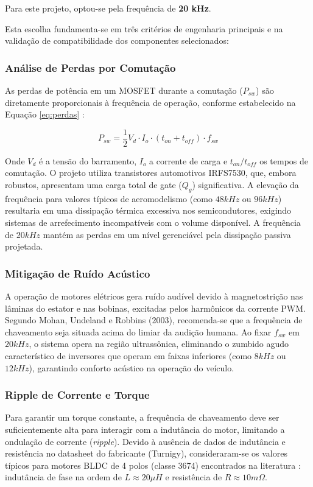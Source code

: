 Para este projeto, optou-se pela frequência de \textbf{20 kHz}.

Esta escolha fundamenta-se em três critérios de engenharia principais e na validação de compatibilidade dos componentes selecionados:

\subsubsection{Análise de Perdas por Comutação}
As perdas de potência em um MOSFET durante a comutação ($P_{sw}$) são diretamente proporcionais à frequência de operação, conforme estabelecido na Equação \ref{eq:perdas} \cite{rashid2014power}:

\begin{equation} \label{eq:perdas}
P_{sw} = \frac{1}{2} V_{d} \cdot I_{o} \cdot (t_{on} + t_{off}) \cdot f_{sw}
\end{equation}

Onde $V_d$ é a tensão do barramento, $I_o$ a corrente de carga e $t_{on}/t_{off}$ os tempos de comutação.
O projeto utiliza transistores automotivos IRFS7530, que, embora robustos, apresentam uma carga total de gate ($Q_g$) significativa. A elevação da frequência para valores típicos de aeromodelismo (como $48 kHz$ ou $96 kHz$) resultaria em uma dissipação térmica excessiva nos semicondutores, exigindo sistemas de arrefecimento incompatíveis com o volume disponível. A frequência de $20 kHz$ mantém as perdas em um nível gerenciável pela dissipação passiva projetada.

\subsubsection{Mitigação de Ruído Acústico}
A operação de motores elétricos gera ruído audível devido à magnetostrição nas lâminas do estator e nas bobinas, excitadas pelos harmônicos da corrente PWM. Segundo Mohan, Undeland e Robbins (2003), recomenda-se que a frequência de chaveamento seja situada acima do limiar da audição humana.
Ao fixar $f_{sw}$ em $20 kHz$, o sistema opera na região ultrassônica, eliminando o zumbido agudo característico de inversores que operam em faixas inferiores (como $8 kHz$ ou $12 kHz$), garantindo conforto acústico na operação do veículo.

\subsubsection{Ripple de Corrente e Torque}
Para garantir um torque constante, a frequência de chaveamento deve ser suficientemente alta para interagir com a indutância do motor, limitando a ondulação de corrente (\textit{ripple}). Devido à ausência de dados de indutância e resistência no datasheet do fabricante (Turnigy), consideraram-se os valores típicos para motores BLDC de 4 polos (classe 3674) encontrados na literatura \cite{hanselman2003brushless}: indutância de fase na ordem de $L \approx 20 \mu H$ e resistência de $R \approx 10 m\Omega$.

